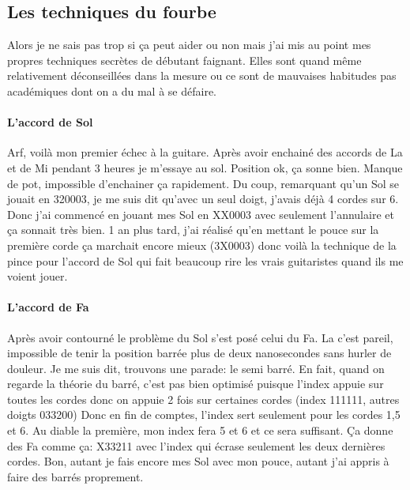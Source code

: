 \documentclass[a4paper]{article}
\begin{document}
\subsection{Les techniques du fourbe}

Alors je ne sais pas trop si ça peut aider ou non mais j'ai mis au
point mes propres techniques secrètes de débutant faignant. Elles sont
quand même relativement déconseillées dans la mesure ou ce sont de
mauvaises habitudes pas académiques dont on a du mal à se défaire.

\paragraph{L'accord de Sol}
Arf, voilà mon premier échec à la guitare. Après avoir enchainé des
accords de La et de Mi pendant 3 heures je m'essaye au sol. Position
ok, ça sonne bien. Manque de pot, impossible d'enchainer ça
rapidement.  Du coup, remarquant qu'un Sol se jouait en 320003, je me
suis dit qu'avec un seul doigt, j'avais déjà 4 cordes sur 6. Donc j'ai
commencé en jouant mes Sol en XX0003 avec seulement l'annulaire et ça
sonnait très bien. 1 an plus tard, j'ai réalisé qu'en mettant le pouce
sur la première corde ça marchait encore mieux (3X0003) donc voilà la
technique de la pince pour l'accord de Sol qui fait beaucoup rire les
vrais guitaristes quand ils me voient jouer.

\paragraph{L'accord de Fa}
Après avoir contourné le problème du Sol s'est posé celui du Fa. La
c'est pareil, impossible de tenir la position barrée plus de deux
nanosecondes sans hurler de douleur.  Je me suis dit, trouvons une parade:
le semi barré.  En fait, quand on regarde la théorie du barré, c'est
pas bien optimisé puisque l'index appuie sur toutes les cordes donc on
appuie 2 fois sur certaines cordes (index 111111, autres doigts 033200)
Donc en fin de comptes, l'index sert seulement pour les cordes 1,5 et
6. Au diable la première, mon index fera 5 et 6 et ce sera suffisant.
Ça donne des Fa comme ça: X33211 avec l'index qui écrase seulement les
deux dernières cordes. Bon, autant je fais encore mes Sol avec mon
pouce, autant j'ai appris à faire des barrés proprement.
\end{document}
